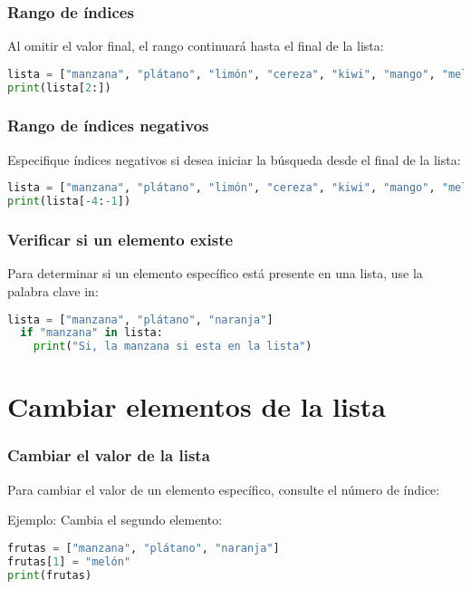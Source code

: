 \begin{frame}[fragile]
  \frametitle{Rango de índices}

  Al omitir el valor final, el rango continuará hasta el final de la lista: 
  \vspace{\baselineskip}
  \begin{lstlisting}[language=Python]
lista = ["manzana", "plátano", "limón", "cereza", "kiwi", "mango", "melón"]
print(lista[2:]) 
  \end{lstlisting}
\end{frame}

\begin{frame}[fragile]
  \frametitle{Rango de índices negativos}

  Especifique índices negativos si desea iniciar la búsqueda
  desde el final de la lista:

  \vspace{\baselineskip}
  \begin{lstlisting}[language=Python]
lista = ["manzana", "plátano", "limón", "cereza", "kiwi", "mango", "melón"]
print(lista[-4:-1]) 
  \end{lstlisting}
\end{frame}

\begin{frame}[fragile]
  \frametitle{Verificar si un elemento existe}

  Para determinar si un elemento específico está presente en una lista,
  use la palabra clave
  \textcolor{codeKeyword}{in}:

  \vspace{\baselineskip}
  \begin{lstlisting}[language=Python]
  lista = ["manzana", "plátano", "naranja"]
  if "manzana" in lista:
    print("Si, la manzana si esta en la lista")
  \end{lstlisting}
\end{frame}

\section{Cambiar elementos de la lista}

\begin{frame}[fragile]
  \frametitle{Cambiar el valor de la lista}

  Para cambiar el valor de un elemento específico,
  consulte el número de índice:

  \vspace{\baselineskip}
  Ejemplo: Cambia el segundo elemento:
  \begin{lstlisting}[language=Python]
frutas = ["manzana", "plátano", "naranja"]
frutas[1] = "melón"
print(frutas)
  \end{lstlisting}
\end{frame}

